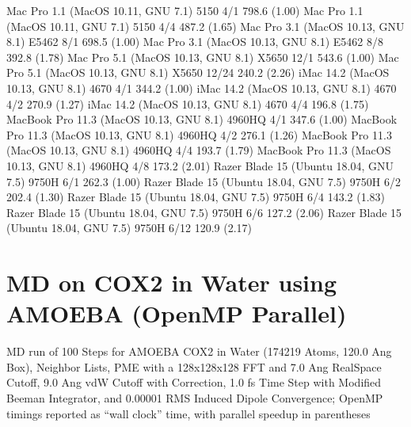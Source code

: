 \documentclass[letterpaper,11pt,english]{sphinxmanual}
\begin{document}

\begin{sphinxVerbatim}[commandchars=\\\{\}]
Mac Pro 1.1 (MacOS 10.11, GNU 7.1)             5150           4/1        798.6 (1.00)
Mac Pro 1.1 (MacOS 10.11, GNU 7.1)             5150           4/4        487.2 (1.65)
Mac Pro 3.1 (MacOS 10.13, GNU 8.1)            E5462           8/1        698.5 (1.00)
Mac Pro 3.1 (MacOS 10.13, GNU 8.1)            E5462           8/8        392.8 (1.78)
Mac Pro 5.1 (MacOS 10.13, GNU 8.1)            X5650          12/1        543.6 (1.00)
Mac Pro 5.1 (MacOS 10.13, GNU 8.1)            X5650         12/24        240.2 (2.26)
iMac 14.2 (MacOS 10.13, GNU 8.1)               4670           4/1        344.2 (1.00)
iMac 14.2 (MacOS 10.13, GNU 8.1)               4670           4/2        270.9 (1.27)
iMac 14.2 (MacOS 10.13, GNU 8.1)               4670           4/4        196.8 (1.75)
MacBook Pro 11.3 (MacOS 10.13, GNU 8.1)      4960HQ           4/1        347.6 (1.00)
MacBook Pro 11.3 (MacOS 10.13, GNU 8.1)      4960HQ           4/2        276.1 (1.26)
MacBook Pro 11.3 (MacOS 10.13, GNU 8.1)      4960HQ           4/4        193.7 (1.79)
MacBook Pro 11.3 (MacOS 10.13, GNU 8.1)      4960HQ           4/8        173.2 (2.01)
Razer Blade 15 (Ubuntu 18.04, GNU 7.5)        9750H           6/1        262.3 (1.00)
Razer Blade 15 (Ubuntu 18.04, GNU 7.5)        9750H           6/2        202.4 (1.30)
Razer Blade 15 (Ubuntu 18.04, GNU 7.5)        9750H           6/4        143.2 (1.83)
Razer Blade 15 (Ubuntu 18.04, GNU 7.5)        9750H           6/6        127.2 (2.06)
Razer Blade 15 (Ubuntu 18.04, GNU 7.5)        9750H          6/12        120.9 (2.17)
\end{sphinxVerbatim}


\section{MD on COX\sphinxhyphen{}2 in Water using AMOEBA (OpenMP Parallel)}
\label{\detokenize{text/benchmarks:md-on-cox-2-in-water-using-amoeba-openmp-parallel}}
MD run of 100 Steps for AMOEBA COX\sphinxhyphen{}2 in Water (174219 Atoms, 120.0 Ang Box), Neighbor Lists, PME with a 128x128x128 FFT and 7.0 Ang Real\sphinxhyphen{}Space Cutoff, 9.0 Ang vdW Cutoff with Correction, 1.0 fs Time Step with Modified Beeman Integrator, and 0.00001 RMS Induced Dipole Convergence; OpenMP timings reported as “wall clock” time, with parallel speedup in parentheses
\end{document}
